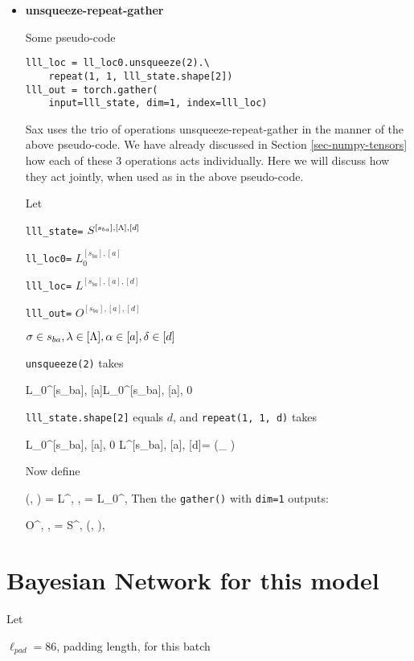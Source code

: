 \begin{itemize}
\item {\bf unsqueeze-repeat-gather}

Some pseudo-code
\begin{mdframed}[hidealllines=true,backgroundcolor=blue!10]
\begin{verbatim}
lll_loc = ll_loc0.unsqueeze(2).\
    repeat(1, 1, lll_state.shape[2])
lll_out = torch.gather(
    input=lll_state, dim=1, index=lll_loc)
\end{verbatim}
\end{mdframed}
Sax uses the trio of operations unsqueeze-repeat-gather
in the manner of the above pseudo-code. We have already
discussed in Section \ref{sec-numpy-tensors}
how each of these 3 operations
acts individually. Here we will discuss how they
act jointly, when used as in the above
pseudo-code.

Let

{\tt lll\_state=} $S^{[s_{ba}],[\Lambda], [d]}$

{\tt ll\_loc0=} $L_0^{[s_{ba}], [a]}$

{\tt lll\_loc=} $L^{[s_{ba}], [a], [d]}$

{\tt lll\_out=} $O^{[s_{ba}], [a], [d]}$

$\sigma\in s_{ba}, \lambda \in[\Lambda], \alpha\in[a], \delta\in[d]$

{\tt unsqueeze(2)} takes

\beq
L_0^{[s_{ba}], [a]}\rarrow L_0^{[s_{ba}], [a], 0}
\eeq

{\tt lll\_state.shape[2]} equals $d$, and {\tt repeat(1, 1, d)}
takes

\beq
L_0^{[s_{ba}], [a], 0}\rarrow
L^{[s_{ba}], [a], [d]}=
(_
{})
\eeq

Now define

\beq
\lam(\s, \alp)
=
L^{\s, \alp, \delta}=
L_0^{\s, \alp}
\eeq
Then the {\tt gather()}
with {\tt dim=1} outputs:

\beq
O^{\s, \alp, \delta}=
S^{\s, \lam(\s, \alp), \delta}
\eeq





\end{itemize}

\section{Bayesian Network for this model}

Let

$\ell_{pad}=86$, padding length, for this batch

